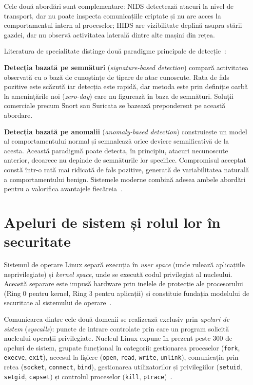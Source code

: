 Cele două abordări sunt complementare: NIDS detectează atacuri la nivel de transport, dar nu poate
inspecta comunicațiile criptate și nu are acces la comportamentul intern al proceselor; HIDS are
vizibilitate deplină asupra stării gazdei, dar nu observă activitatea laterală dintre alte mașini
din rețea.

Literatura de specialitate distinge două paradigme principale de detecție~\cite{liu2018hids,ring2021deep}:

\textbf{Detecția bazată pe semnături} (\textit{signature-based detection}) compară activitatea
observată cu o bază de cunoștințe de tipare de atac cunoscute. Rata de fals pozitive este scăzută
iar detecția este rapidă, dar metoda este prin definiție oarbă la amenințările noi (\textit{zero-day})
care nu figurează în baza de semnături. Soluții comerciale precum Snort sau Suricata se bazează
preponderent pe această abordare.

\textbf{Detecția bazată pe anomalii} (\textit{anomaly-based detection}) construiește un model al
comportamentului normal și semnalează orice deviere semnificativă de la acesta. Această paradigmă
poate detecta, în principiu, atacuri necunoscute anterior, deoarece nu depinde de semnăturile lor
specifice. Compromisul acceptat constă într-o rată mai ridicată de fals pozitive, generată de
variabilitatea naturală a comportamentului benign. Sistemele moderne combină adesea ambele abordări
pentru a valorifica avantajele fiecăreia~\cite{ring2021deep}.

\section{Apeluri de sistem și rolul lor în securitate}

Sistemul de operare Linux separă execuția în \textit{user space} (unde rulează aplicațiile
neprivilegiate) și \textit{kernel space}, unde se execută codul privilegiat al nucleului.
Această separare este impusă hardware prin inelele de protecție ale procesorului (Ring 0 pentru
kernel, Ring 3 pentru aplicații) și constituie fundația modelului de securitate al sistemului
de operare~\cite{bovet2005understanding}.

Comunicarea dintre cele două domenii se realizează exclusiv prin \textit{apeluri de sistem}
(\textit{syscalls}): puncte de intrare controlate prin care un program solicită nucleului operații
privilegiate. Nucleul Linux expune în prezent peste 300 de apeluri de sistem, grupate funcțional
în categorii: gestionarea proceselor (\texttt{fork}, \texttt{execve}, \texttt{exit}), accesul la
fișiere (\texttt{open}, \texttt{read}, \texttt{write}, \texttt{unlink}), comunicația prin rețea
(\texttt{socket}, \texttt{connect}, \texttt{bind}), gestionarea utilizatorilor și privilegiilor
(\texttt{setuid}, \texttt{setgid}, \texttt{capset}) și controlul proceselor
(\texttt{kill}, \texttt{ptrace})~\cite{kerrisk2010linux}.


